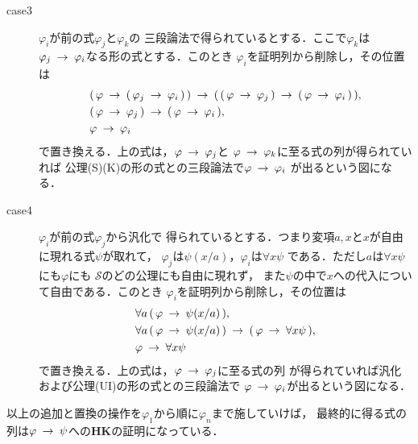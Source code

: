 \begin{metaprf}
\begin{description}
\begin{description}
					\item[case3] $\varphi_{i}$が前の式$\varphi_{j}$と$\varphi_{k}$の
						三段論法で得られているとする．ここで$\varphi_{k}$は
						$\varphi_{j} \hspace{0.25em}\rightarrow\hspace{0.25em} \varphi_{i}$なる形の式とする．このとき
						$\varphi_{i}$を証明列から削除し，その位置は
						\begin{align}
							&(\, \varphi \hspace{0.25em}\rightarrow\hspace{0.25em} (\, \varphi_{j} \hspace{0.25em}\rightarrow\hspace{0.25em} \varphi_{i}\, )\, )
								\hspace{0.25em}\rightarrow\hspace{0.25em} (\, (\, \varphi \hspace{0.25em}\rightarrow\hspace{0.25em} \varphi_{j}\, )
								\hspace{0.25em}\rightarrow\hspace{0.25em} (\, \varphi \hspace{0.25em}\rightarrow\hspace{0.25em} \varphi_{i}\, )\, ), \\
							&(\, \varphi \hspace{0.25em}\rightarrow\hspace{0.25em} \varphi_{j}\, )
								\hspace{0.25em}\rightarrow\hspace{0.25em} (\, \varphi \hspace{0.25em}\rightarrow\hspace{0.25em} \varphi_{i}\, ), \\
							&\varphi \hspace{0.25em}\rightarrow\hspace{0.25em} \varphi_{i}
						\end{align}
						で置き換える．上の式は，$\varphi \hspace{0.25em}\rightarrow\hspace{0.25em} \varphi_{j}$と
						$\varphi \hspace{0.25em}\rightarrow\hspace{0.25em} \varphi_{k}$に至る式の列が得られていれば
						公理(S)(K)の形の式との三段論法で$\varphi \hspace{0.25em}\rightarrow\hspace{0.25em} \varphi_{i}$
						が出るという図になる．
						
					\item[case4] $\varphi_{i}$が前の式$\varphi_{j}$から汎化で
						得られているとする．つまり変項$a,x$と$x$が自由に現れる式$\psi$が取れて，
						$\varphi_{j}$は$\psi(x/a)$，$\varphi_{i}$は$\forall x \psi$
						である．ただし$a$は$\forall x \psi$にも$\varphi$にも
						$\mathscr{S}$のどの公理にも自由に現れず，
						また$\psi$の中で$x$への代入について自由である．このとき
						$\varphi_{i}$を証明列から削除し，その位置は
						\begin{align}
							&\forall a\, (\, \varphi \hspace{0.25em}\rightarrow\hspace{0.25em} \psi(x/a)\, ), \\
							&\forall a\, (\, \varphi \hspace{0.25em}\rightarrow\hspace{0.25em} \psi(x/a)\, )
							\hspace{0.25em}\rightarrow\hspace{0.25em} (\, \varphi \hspace{0.25em}\rightarrow\hspace{0.25em} \forall x \psi\, ), \\
							&\varphi \hspace{0.25em}\rightarrow\hspace{0.25em} \forall x \psi
						\end{align}
						で置き換える．上の式は，$\varphi \hspace{0.25em}\rightarrow\hspace{0.25em} \varphi_{j}$に至る式の列
						が得られていれば汎化および公理(UI)の形の式との三段論法で
						$\varphi \hspace{0.25em}\rightarrow\hspace{0.25em} \varphi_{i}$が出るという図になる．
				\end{description}
				以上の追加と置換の操作を$\varphi_{1}$から順に$\varphi_{n}$まで施していけば，
				最終的に得る式の列は$\varphi \hspace{0.25em}\rightarrow\hspace{0.25em} \psi$への{\bf HK}の証明になっている．
				\QED
		\end{description}
	\end{metaprf}